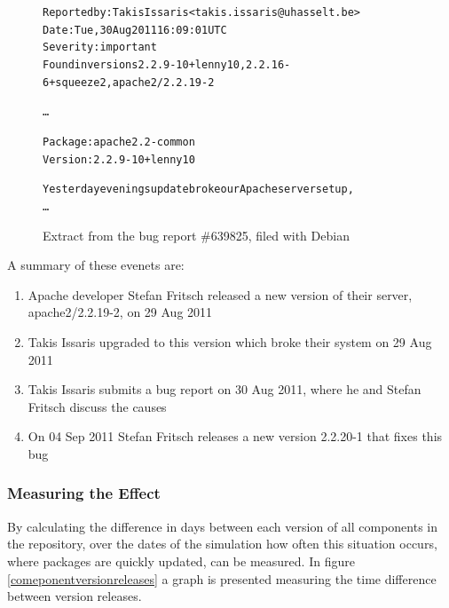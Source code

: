 \begin{figure}[htp]
\begin{center}
\begin{alltt}

Reported by: Takis Issaris <takis.issaris@uhasselt.be>
Date: Tue, 30 Aug 2011 16:09:01 UTC
Severity: important
Found in versions 2.2.9-10+lenny10, 2.2.16-6+squeeze2, apache2/2.2.19-2

\ldots

Package: apache2.2-common
Version: 2.2.9-10+lenny10

Yesterday evenings update broke our Apache server setup,
\ldots
\end{alltt}
\caption[Apache Bug Report]{Extract from the bug report \#639825, filed with Debian}
\label{apachebug}
\end{center}
\end{figure}

A summary of these evenets are:
\begin{enumerate}
  \item Apache developer Stefan Fritsch released a new version of their server, apache2/2.2.19-2, on 29 Aug 2011
  \item Takis Issaris upgraded to this version which broke their system on 29 Aug 2011
  \item Takis Issaris submits a bug report on 30 Aug 2011, where he and Stefan Fritsch discuss the causes
  \item On 04 Sep 2011 Stefan Fritsch releases a new version 2.2.20-1 that fixes this bug
\end{enumerate}


\subsubsection{Measuring the Effect}
By calculating the difference in days between each version of all components in the repository, 
over the dates of the simulation how often this situation occurs, where packages are quickly updated, can be measured.
In figure \ref{comeponentversionreleases} a graph is presented measuring the time difference between version releases.
 
